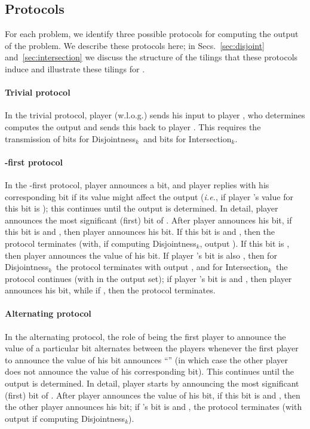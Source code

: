 \documentclass{article}
\theoremstyle{theorem}
\theoremstyle{definition}
\theoremstyle{remark}
\newcommand{\ie}{\emph{i.e.}}
\newcommand{\disjoint}{{\sc Dis\-joint\-ness}\ensuremath{_k}}
\newcommand{\intersection}{{\sc In\-ter\-sec\-tion}\ensuremath{_k}}
\begin{document}
\subsection{Protocols}

For each problem, we identify three possible protocols for computing the output of the problem.  We describe these protocols here; in Secs.~\ref{sec:disjoint} and~\ref{sec:intersection} we discuss the structure of the tilings that these protocols induce and illustrate these tilings for .



\paragraph{Trivial protocol} In the trivial protocol, player  (w.l.o.g.) sends his input to player , who determines computes the output and sends this back to player .  This requires the transmission of  bits for \disjoint\ and  bits for \intersection.


\paragraph{-first protocol} In the -first protocol, player  announces a bit, and player  replies with his corresponding bit if its value might affect the output (\ie, if player 's value for this bit is ); this continues until the output is determined.  In detail, player  announces the most significant (first) bit of .  After player  announces his  bit, if this bit is  and , then player  announces his  bit.  If this bit is  and , then the protocol terminates (with, if computing \disjoint, output ).  If this bit is , then player  announces the value of his  bit.  If player 's  bit is also , then for \disjoint\ the protocol terminates with output , and for \intersection\ the protocol continues (with  in the output set); if player 's bit is  and , then player  announces his  bit, while if , then the protocol terminates.

\paragraph{Alternating protocol} In the alternating protocol, the role of being the first player to announce the value of a particular bit alternates between the players whenever the first player to announce the value of his  bit announces ``'' (in which case the other player does not announce the value of his corresponding bit).  This continues until the output is determined.  In detail, player  starts by announcing the most significant (first) bit of .  After player  announces the value of his  bit, if this bit is  and , then the other player announces his  bit; if 's  bit is  and , the protocol terminates (with output  if computing \disjoint).
\end{document}
